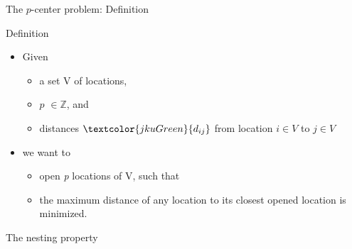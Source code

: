 \documentclass[utf8,aspectratio=169,ngerman,english]{beamer}
\renewcommand{\emph}[1]{\textcolor{jkuGreen}{#1}}
\newcommand{\pCP}{$p$CP}
\newcommand{\npCP}{n-$p$CP}
\begin{document}
\begin{frame}{The $p$-center problem: Definition}
    \begin{block}{Definition}
        \begin{itemize}
            \item Given \pause
                  \begin{itemize}
                      \item a set V of locations, \pause
                      \item \emph{$p$} $\in \mathbb{Z}$, and \pause
                      \item \emph{distances} $\emph{d_{ij}}$ from location $i \in V$ to $j \in V$ \pause
                  \end{itemize}
            \item we want to
                  \begin{itemize}
                      \item \emph{open \textit{p} locations} of V, such that \pause
                      \item the \emph{maximum distance} of any location to its closest opened location is \emph{minimized}.
                  \end{itemize}
        \end{itemize}
    \end{block}
\end{frame}
\begin{frame}{The nesting property}

\end{frame}
\end{document}
